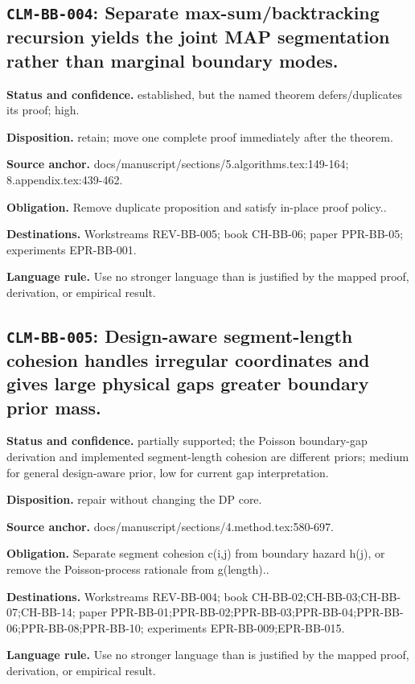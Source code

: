 \subsection[\texttt{CLM-BB-004}]{\texttt{CLM-BB-004}: Separate max-sum/backtracking recursion yields the joint MAP segmentation rather than marginal boundary modes.}
\textbf{Status and confidence.} established, but the named theorem defers/duplicates its proof; high.\par
\textbf{Disposition.} retain; move one complete proof immediately after the theorem.\par
\textbf{Source anchor.} docs/manuscript/sections/5.algorithms.tex:149-164; 8.appendix.tex:439-462.\par
\textbf{Obligation.} Remove duplicate proposition and satisfy in-place proof policy..\par
\textbf{Destinations.} Workstreams REV-BB-005; book CH-BB-06; paper PPR-BB-05; experiments EPR-BB-001.\par
\textbf{Language rule.} Use no stronger language than is justified by the mapped proof, derivation, or empirical result.

\subsection[\texttt{CLM-BB-005}]{\texttt{CLM-BB-005}: Design-aware segment-length cohesion handles irregular coordinates and gives large physical gaps greater boundary prior mass.}
\textbf{Status and confidence.} partially supported; the Poisson boundary-gap derivation and implemented segment-length cohesion are different priors; medium for general design-aware prior, low for current gap interpretation.\par
\textbf{Disposition.} repair without changing the DP core.\par
\textbf{Source anchor.} docs/manuscript/sections/4.method.tex:580-697.\par
\textbf{Obligation.} Separate segment cohesion c(i,j) from boundary hazard h(j), or remove the Poisson-process rationale from g(length)..\par
\textbf{Destinations.} Workstreams REV-BB-004; book CH-BB-02;CH-BB-03;CH-BB-07;CH-BB-14; paper PPR-BB-01;PPR-BB-02;PPR-BB-03;PPR-BB-04;PPR-BB-06;PPR-BB-08;PPR-BB-10; experiments EPR-BB-009;EPR-BB-015.\par
\textbf{Language rule.} Use no stronger language than is justified by the mapped proof, derivation, or empirical result.

